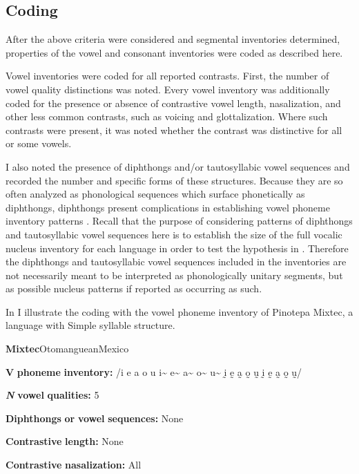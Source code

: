 \subsection{Coding}\label{sec:4.2.2}

  After the above criteria were considered and segmental inventories determined, properties of the vowel and consonant inventories were coded as described here.

  Vowel inventories were coded for all reported contrasts. First, the number of vowel quality distinctions was noted. Every vowel inventory was additionally coded for the presence or absence of contrastive vowel length, nasalization, and other less common contrasts, such as voicing and glottalization. Where such contrasts were present, it was noted whether the contrast was distinctive for all or some vowels. 

  I also noted the presence of diphthongs and/or tautosyllabic vowel sequences and recorded the number and specific forms of these structures. Because they are so often analyzed as phonological sequences which surface phonetically as diphthongs, diphthongs present complications in establishing vowel phoneme inventory patterns \citep[133]{Maddieson1984}. Recall that the purpose of considering patterns of diphthongs and tautosyllabic vowel sequences here is to establish the size of the full vocalic nucleus inventory for each language in order to test the hypothesis in . Therefore the diphthongs and tautosyllabic vowel sequences included in the inventories are not necessarily meant to be interpreted as phonologically unitary segments, but as possible nucleus patterns if reported as occurring as such.

  In  I illustrate the coding with the vowel phoneme inventory of Pinotepa Mixtec, a language with Simple syllable structure.

\ea\label{ex:(4.9)}
 \textbf{Mixtec}{Otomanguean}{Mexico}

\textbf{V} \textbf{phoneme} \textbf{inventory:} /i e a o u i\~{}  e\~{}  a\~{}  o\~{}  u\~{}  ḭ ḛ a̰ o̰ ṵ ḭ ḛ a̰ o̰ ṵ/

\textbf{\textit{N}} \textbf{vowel} \textbf{qualities:} 5

\textbf{Diphthongs} \textbf{or} \textbf{vowel} \textbf{sequences:} None

\textbf{Contrastive} \textbf{length:} None

\textbf{Contrastive} \textbf{nasalization:} All

